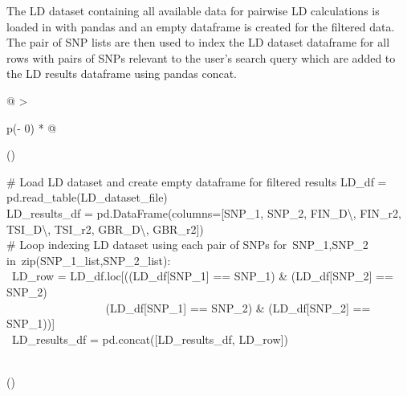 \documentclass[12pt,a4paper]{article}
\begin{document}
{}

{The LD dataset containing all available data for pairwise LD
calculations is loaded in with pandas and an empty dataframe is created
for the filtered data. The pair of SNP lists are then used to index the
LD dataset dataframe for all rows with pairs of SNPs relevant to the
user's search query which are added to the LD results dataframe using
pandas concat.}

\protect\hypertarget{t.258f382ba68c7d1d3a17e1bbd7a0ff9175b6a7fa}{}{}\protect\hypertarget{t.13}{}{}

\begin{longtable}[]{@{}
  >{\raggedright\arraybackslash}p{(\columnwidth - 0\tabcolsep) * }@{}}
\toprule()
\endhead
\begin{minipage}[t]{\linewidth}\raggedright
{\# Load LD dataset and create empty dataframe for filtered
results}{\hfill\break
LD\_df = pd.read\_table(LD\_dataset\_file)\\
LD\_results\_df =
pd.DataFrame(columns={[}}{\textquotesingle SNP\_1\textquotesingle{}}{,
}{\textquotesingle SNP\_2\textquotesingle{}}{,
}{\textquotesingle FIN\_D\textbackslash\textquotesingle\textquotesingle{}}{,
}{\textquotesingle FIN\_r2\textquotesingle{}}{,
}{\textquotesingle TSI\_D\textbackslash\textquotesingle\textquotesingle{}}{,
}{\textquotesingle TSI\_r2\textquotesingle{}}{,
}{\textquotesingle GBR\_D\textbackslash\textquotesingle\textquotesingle{}}{,
}{\textquotesingle GBR\_r2\textquotesingle{}}{{]})\\
}{\# Loop indexing LD dataset using each pair of SNPs}{\hfill\break
}{for}{~SNP\_1,SNP\_2 }{in}{~zip(SNP\_1\_list,SNP\_2\_list):\\
\hspace*{0.333em} ~LD\_row =
LD\_df.loc{[}((LD\_df{[}}{\textquotesingle SNP\_1\textquotesingle{}}{{]}
== SNP\_1) \& (LD\_df{[}}{\textquotesingle SNP\_2\textquotesingle{}}{{]}
== SNP\_2) \textbar{}\\
\hspace*{0.333em} ~ ~ ~ ~ ~ ~ ~ ~ ~ ~
~(LD\_df{[}}{\textquotesingle SNP\_1\textquotesingle{}}{{]} == SNP\_2)
\& (LD\_df{[}}{\textquotesingle SNP\_2\textquotesingle{}}{{]} ==
SNP\_1)){]}\\
\hspace*{0.333em} ~LD\_results\_df = pd.concat({[}LD\_results\_df,
LD\_row{]})}\strut
\end{minipage} \\
\bottomrule()
\end{longtable}
\end{document}
